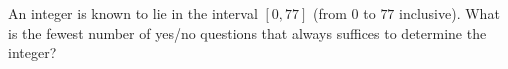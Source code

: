 An integer is known to lie in the interval $[0,77]$ (from $0$ to $77$ inclusive). What is the fewest number of yes/no questions that always suffices to determine the integer?
